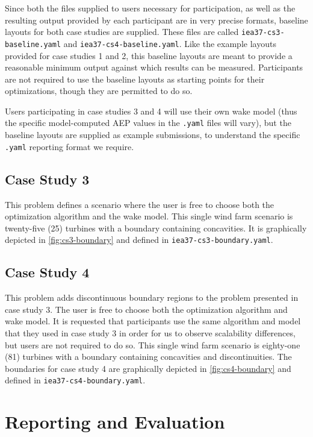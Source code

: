 \documentclass[10pt]{article}
\begin{document}
        Since both the files supplied to users necessary for participation, as well as the resulting output provided by each participant are in very precise formats, baseline layouts for both case studies are supplied.
        These files are called \texttt{iea37-cs3-baseline.yaml} and \texttt{iea37-cs4-baseline.yaml}.
        Like the example layouts provided for case studies 1 and 2, this baseline layouts are meant to provide a reasonable minimum output against which results can be measured.
        Participants are not required to use the baseline layouts as starting points for their optimizations, though they are permitted to do so.
        
        Users participating in case studies 3 and 4 will use their own wake model (thus the specific model-computed AEP values in the \texttt{.yaml} files will vary), but the baseline layouts are supplied as example submissions, to understand the specific \texttt{.yaml} reporting format we require.

    \subsection{Case Study 3}

        This problem defines a scenario where the user is free to choose both the optimization algorithm and the wake model.
        This single wind farm scenario is twenty-five (25) turbines with a boundary containing concavities.
        It is graphically depicted in \cref{fig:cs3-boundary} and defined in \texttt{iea37-cs3-boundary.yaml}.
    
    \subsection{Case Study 4}

        This problem adds discontinuous boundary regions to the problem presented in case study 3.
        The user is free to choose both the optimization algorithm and wake model.
        It is requested that participants use the same algorithm and model that they used in case study 3 in order for us to observe scalability differences, but users are not required to do so.
        This single wind farm scenario is eighty-one (81) turbines with a boundary containing concavities and discontinuities.
        The boundaries for case study 4 are graphically depicted in \cref{fig:cs4-boundary} and defined in \texttt{iea37-cs4-boundary.yaml}.

\section{Reporting and Evaluation}
\end{document}

